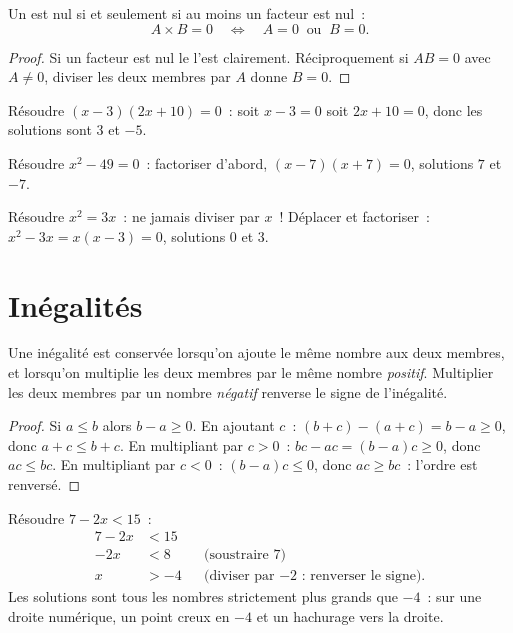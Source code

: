 \begin{theorem}\label{thm:g9:algebra:zeroproduct}
Un  est nul si et seulement si au moins un facteur est nul~:
\[
A \times B = 0
\quad\Longleftrightarrow\quad
A = 0 \ \text{ ou } \ B = 0 .
\]
\end{theorem}

\begin{proof}
Si un facteur est nul le  l'est clairement. Réciproquement si
$A B = 0$ avec $A \neq 0$, diviser les deux membres par $A$ donne
$B = 0$.
\end{proof}

\begin{example}\label{ex:g9:algebra:zeroproduct}
Résoudre $(x - 3)(2x + 10) = 0$~: soit $x - 3 = 0$ soit $2x + 10 = 0$,
donc les solutions sont $3$ et $-5$.

Résoudre $x^2 - 49 = 0$~: factoriser d'abord, $(x-7)(x+7) = 0$,
solutions $7$ et $-7$.

Résoudre $x^2 = 3x$~: ne jamais diviser par $x$~! Déplacer et
factoriser~: $x^2 - 3x = x(x - 3) = 0$, solutions $0$ et $3$.
\end{example}

\section{Inégalités}

\begin{proposition}\label{prop:g9:algebra:ineq}
Une inégalité est conservée lorsqu'on ajoute le même nombre aux deux
membres, et lorsqu'on multiplie les deux membres par le même nombre
\emph{positif}. Multiplier les deux membres par un nombre \emph{négatif}
renverse le signe de l'inégalité.
\end{proposition}

\begin{proof}
Si $a \leq b$ alors $b - a \geq 0$. En ajoutant $c$~:
$(b+c) - (a+c) = b - a \geq 0$, donc $a + c \leq b + c$. En multipliant
par $c > 0$~: $bc - ac = (b-a)c \geq 0$, donc $ac \leq bc$. En
multipliant par $c < 0$~: $(b-a)c \leq 0$, donc $ac \geq bc$~: l'ordre
est renversé.
\end{proof}

\begin{example}\label{ex:g9:algebra:ineq}
Résoudre $7 - 2x < 15$~:
\begin{align*}
7 - 2x &< 15 \\
-2x &< 8 && \text{(soustraire 7)} \\
x &> -4 && \text{(diviser par $-2$~: renverser le signe).}
\end{align*}
Les solutions sont tous les nombres strictement plus grands que $-4$~:
sur une droite numérique, un point creux en $-4$ et un hachurage vers la
droite.
\end{example}

